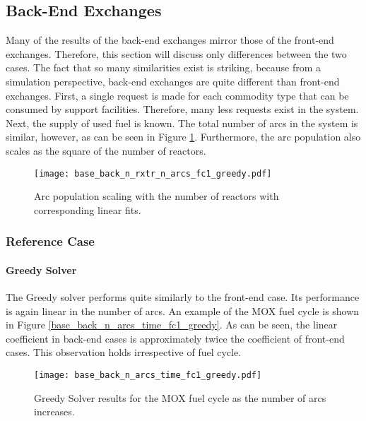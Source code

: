 \subsection{Back-End Exchanges}

Many of the results of the back-end exchanges mirror those of the front-end
exchanges. Therefore, this section will discuss only differences between the two
cases. The fact that so many similarities exist is striking, because from a
simulation perspective, back-end exchanges are quite different than front-end
exchanges. First, a single request is made for each commodity type that can be
consumed by support facilities. Therefore, many less requests exist in the
system. Next, the supply of used fuel is known. The total number of arcs in the
system is similar, however, as can be seen in Figure
\ref{fig:base_back_n_rxtr_n_arcs_fc1_greedy}. Furthermore, the arc
population also scales as the square of the number of reactors. 

\begin{figure}[h!]
  \begin{center}
    \texttt{[image: base\_back\_n\_rxtr\_n\_arcs\_fc1\_greedy.pdf]}
    \caption{
      \label{fig:base_back_n_rxtr_n_arcs_fc1_greedy}
      Arc population scaling with the number of reactors with corresponding linear fits.}
  \end{center}
\end{figure}

\subsubsection{Reference Case}

\paragraph{Greedy Solver}

The Greedy solver performs quite similarly to the front-end case. Its
performance is again linear in the number of arcs. An example of the MOX fuel
cycle is shown in Figure \ref{base_back_n_arcs_time_fc1_greedy}. As can be seen,
the linear coefficient in back-end cases is approximately twice the coefficient
of front-end cases. This observation holds irrespective of fuel cycle.

\begin{figure}[h!]
  \begin{center}
    \texttt{[image: base\_back\_n\_arcs\_time\_fc1\_greedy.pdf]}
    \caption{
      \label{fig:base_back_n_arcs_time_fc1_greedy}
      Greedy Solver results for the MOX fuel cycle as the number of arcs
      increases.      
    }
  \end{center}
\end{figure}

